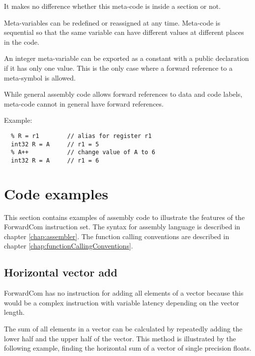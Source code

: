 \documentclass[forwardcom.tex]{subfiles}
\begin{document}
It makes no difference whether this meta-code is inside a section or not.
\vv

Meta-variables can be redefined or reassigned at any time. Meta-code is sequential so that the same variable can have different values at different places in the code.
\vv

An integer meta-variable can be exported as a constant with a public declaration if it has only one value. This is the only case where a forward reference to a meta-symbol is allowed.
\vv

While general assembly code allows forward references to data and code labels, meta-code cannot in general have forward references.
\vv

Example:
\vv

\begin{lstlisting}[frame=single]
  % A = 5         // meta-variable integer A = 5
  % R = r1        // alias for register r1
  int32 R = A     // r1 = 5
  % A++           // change value of A to 6
  int32 R = A     // r1 = 6
\end{lstlisting}
\vv



\section{Code examples}\label{chap:codeExamples}

This section contains examples of assembly code to illustrate the features of the ForwardCom instruction set.
The syntax for assembly language is described in chapter \ref{chap:assembler}.
The function calling conventions are described in chapter \ref{chap:functionCallingConventions}.
\vv


\subsection{Horizontal vector add} \label{horizontalVectorAdd}
ForwardCom has no instruction for adding all elements of a vector because this would be a complex instruction with variable latency depending on the vector length.
\vv

The sum of all elements in a vector can be calculated by repeatedly adding the lower half and the upper half of the vector. This method is illustrated by the following example, finding the horizontal sum of a vector of single precision floats. 
\end{document}
